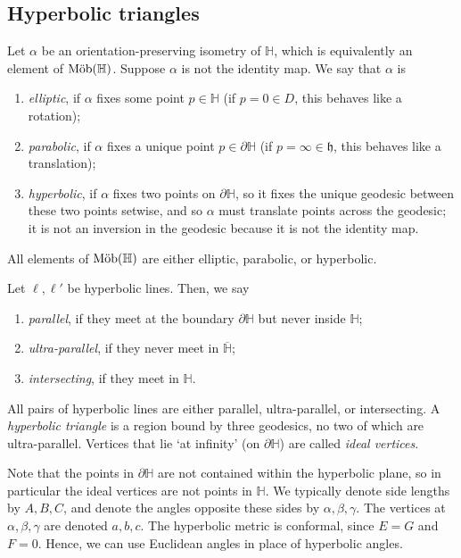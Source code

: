 \subsection{Hyperbolic triangles}
\begin{definition}
	Let $\alpha$ be an orientation-preserving isometry of $\mathbb H$, which is equivalently an element of $\text{M\"ob}(\mathbb H)$.
	Suppose $\alpha$ is not the identity map.
	We say that $\alpha$ is
	\begin{enumerate}
		\item \textit{elliptic}, if $\alpha$ fixes some point $p \in \mathbb H$ (if $p = 0 \in D$, this behaves like a rotation);
		\item \textit{parabolic}, if $\alpha$ fixes a unique point $p \in \partial \mathbb H$ (if $p = \infty \in \mathfrak{h}$, this behaves like a translation);
		\item \textit{hyperbolic}, if $\alpha$ fixes two points on $\partial \mathbb H$, so it fixes the unique geodesic between these two points setwise, and so $\alpha$ must translate points across the geodesic; it is not an inversion in the geodesic because it is not the identity map.
	\end{enumerate}
	All elements of $\text{M\"ob}(\mathbb H)$ are either elliptic, parabolic, or hyperbolic.
\end{definition}
\begin{definition}
	Let $\ell, \ell'$ be hyperbolic lines.
	Then, we say
	\begin{enumerate}
		\item \textit{parallel}, if they meet at the boundary $\partial \mathbb H$ but never inside $\mathbb H$;
		\item \textit{ultra-parallel}, if they never meet in $\overline{\mathbb H}$;
		\item \textit{intersecting}, if they meet in $\mathbb H$.
	\end{enumerate}
	All pairs of hyperbolic lines are either parallel, ultra-parallel, or intersecting.
	A \textit{hyperbolic triangle} is a region bound by three geodesics, no two of which are ultra-parallel.
	Vertices that lie `at infinity' (on $\partial \mathbb H$) are called \textit{ideal vertices}.
\end{definition}
Note that the points in $\partial \mathbb H$ are not contained within the hyperbolic plane, so in particular the ideal vertices are not points in $\mathbb H$.
We typically denote side lengths by $A, B, C$, and denote the angles opposite these sides by $\alpha, \beta, \gamma$.
The vertices at $\alpha, \beta, \gamma$ are denoted $a, b, c$.
The hyperbolic metric is conformal, since $E = G$ and $F = 0$.
Hence, we can use Euclidean angles in place of hyperbolic angles.

